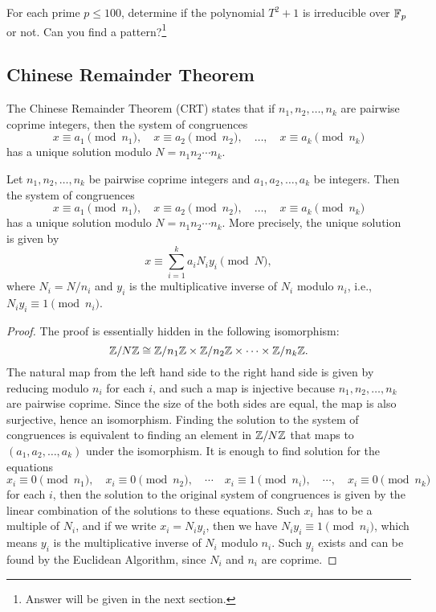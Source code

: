 \begin{exercise}\sage
    For each prime $p \le 100$, determine if the polynomial $T^2 + 1$ is irreducible over $\mathbb{F}_p$ or not. Can you find a pattern?\footnote{Answer will be given in the next section.}
\end{exercise}

\subsection{Chinese Remainder Theorem}
\label{subsec:basicnt_crt}

The Chinese Remainder Theorem (CRT) states that if $n_1, n_2, \ldots, n_k$ are pairwise coprime integers, then the system of congruences
\[
    x \equiv a_1 \pmod{n_1}, \quad x \equiv a_2 \pmod{n_2}, \quad \ldots, \quad x \equiv a_k \pmod{n_k}
\]
has a unique solution modulo $N = n_1 n_2 \cdots n_k$.
\begin{theorem}
    \label{thm:crt}
    Let $n_1, n_2, \ldots, n_k$ be pairwise coprime integers and $a_1, a_2, \ldots, a_k$ be integers.
    Then the system of congruences
    \[
        x \equiv a_1 \pmod{n_1}, \quad x \equiv a_2 \pmod{n_2}, \quad \ldots, \quad x \equiv a_k \pmod{n_k}
    \]
    has a unique solution modulo $N = n_1 n_2 \cdots n_k$.
    More precisely, the unique solution is given by
    \[
        x \equiv \sum_{i=1}^k a_i N_i y_i \pmod{N},
    \]
    where $N_i = N / n_i$ and $y_i$ is the multiplicative inverse of $N_i$ modulo $n_i$, i.e., $N_i y_i \equiv 1 \pmod{n_i}$.
\end{theorem}

\begin{proof}
    The proof is essentially hidden in the following isomorphism:
    \[
        \mathbb{Z} / N\mathbb{Z} \cong \mathbb{Z} / n_1\mathbb{Z} \times \mathbb{Z} / n_2\mathbb{Z} \times \cdots \times \mathbb{Z} / n_k\mathbb{Z}.
    \]
    The natural map from the left hand side to the right hand side is given by reducing modulo $n_i$ for each $i$, and such a map is injective because $n_1, n_2, \ldots, n_k$ are pairwise coprime.
    Since the size of the both sides are equal, the map is also surjective, hence an isomorphism.
    Finding the solution to the system of congruences is equivalent to finding an element in $\mathbb{Z} / N\mathbb{Z}$ that maps to $(a_1, a_2, \ldots, a_k)$ under the isomorphism.
    It is enough to find solution for the equations
    \[
        x_i \equiv 0 \pmod{n_1}, \quad x_i \equiv 0 \pmod{n_2}, \quad \cdots \quad x_i \equiv 1 \pmod{n_i}, \quad \cdots, \quad x_i \equiv 0 \pmod{n_k}
    \]
    for each $i$, then the solution to the original system of congruences is given by the linear combination of the solutions to these equations.
    Such $x_i$ has to be a multiple of $N_i$, and if we write $x_i = N_i y_i$, then we have $N_i y_i \equiv 1 \pmod{n_i}$, which means $y_i$ is the multiplicative inverse of $N_i$ modulo $n_i$.
    Such $y_i$ exists and can be found by the Euclidean Algorithm, since $N_i$ and $n_i$ are coprime.
\end{proof}

